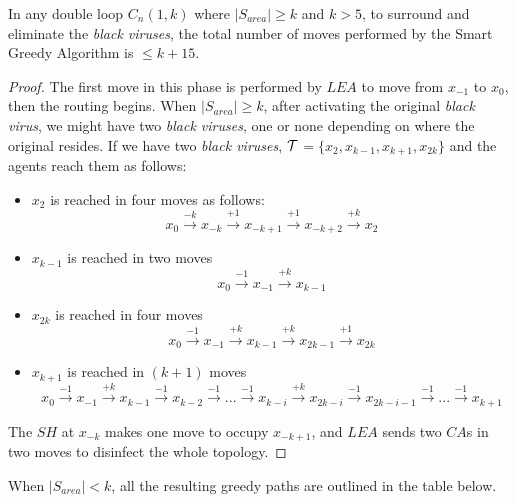 \begin{theorem}
In any double loop  $C_n(1,k)$ where $\left\vert{S_{area}}\right\vert \geq  k$ and $k>5$, to surround and eliminate the {\it black viruses},
 the total number of moves performed by the Smart Greedy Algorithm is $\leq k+15$.
\end{theorem}
\begin{proof}
The first move in this phase is performed by $LEA$ to move from $x_{-1}$ to $x_0$, then the routing begins.
When  $\left\vert{S_{area}}\right\vert \ge k$, after activating the original {\it black virus}, we might have two {\it black viruses}, one \bv or none depending on where the original \bv resides.
If we have two {\it black viruses}, ${\cal T}$$=\{x_{2},x_{k-1},x_{k+1},x_{2k}\}$ and the agents reach them as follows:
\begin{itemize}
\item $x_{2}$ is reached in four moves as follows:
$$x_{0} \xrightarrow {-k} x_{-k} \xrightarrow {+1} x_{-k+1} \xrightarrow {+1} x_{-k+2} \xrightarrow {+k}  x_{2}$$
\item $x_{k-1}$ is reached in two moves
$$x_{0} \xrightarrow {-1} x_{-1} \xrightarrow {+k} x_{k-1}$$
\item $x_{2k}$ is reached in four moves
$$x_{0} \xrightarrow {-1} x_{-1} \xrightarrow {+k} x_{k-1} \xrightarrow {+k} x_{2k-1} \xrightarrow {+1} x_{2k}$$
\item $x_{k+1}$ is reached in $(k+1)$ moves
$$x_{0} \xrightarrow {-1} x_{-1} \xrightarrow {+k} x_{k-1} \xrightarrow {-1} x_{k-2} \xrightarrow {-1} ... \xrightarrow {-1} x_{k-i} \xrightarrow {+k} x_{2k-i} \xrightarrow {-1} x_{2k-i-1} \xrightarrow {-1} ... \xrightarrow {-1} x_{k+1}$$
\end{itemize}
The $SH$ at $x_{-k}$ makes one move to occupy $x_{-k+1}$, and $LEA$ sends two $CA$s in two moves to disinfect the whole topology.
 
\end{proof}

\noindent  When $\left\vert{S_{area}}\right\vert < k$, all the resulting greedy paths are outlined in the table below.

